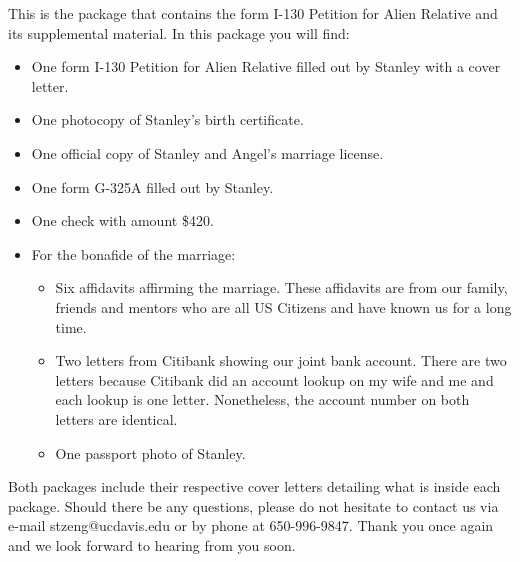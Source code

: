 \documentclass[stdletter]{newlfm}
\begin{document}
 
\begin{newlfm}
This is the package that contains the form I-130 Petition for Alien Relative and its supplemental material.  In this package you will find:
\begin{itemize}

\item One form I-130 Petition for Alien Relative filled out by Stanley with a cover letter.
\item One photocopy of Stanley's birth certificate.
\item One official copy of Stanley and Angel's marriage license.
\item One form G-325A filled out by Stanley.
\item One check with amount \$420.
\item For the bonafide of the marriage:
\begin{itemize}
\item Six affidavits affirming the marriage.  These affidavits are from our family, friends and mentors who are all US Citizens and have known us for a long time.
\item Two letters from Citibank showing our joint bank account.  There are two letters because Citibank did an account lookup on my wife and me and each lookup is one letter.  Nonetheless, the account number on both letters are identical.
\item One passport photo of Stanley.
\end{itemize}

\end{itemize}

Both packages include their respective cover letters detailing what is inside each package.  Should there be any questions, please do not hesitate to contact us via e-mail stzeng@ucdavis.edu or by phone at 650-996-9847.  Thank you once again and we look forward to hearing from you soon.
\end{newlfm}
\end{document}
